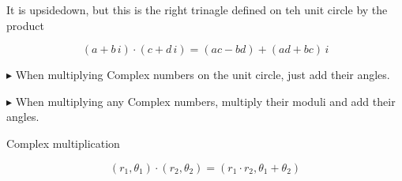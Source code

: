 \documentclass{ximera}
\begin{document}
It is upsidedown, but this is the right trinagle defined on teh unit circle by the product

\[  (a + b \, i) \cdot (c + d \, i) = (ac-bd) + (ad+bc) \, i    \]




$\blacktriangleright$ When multiplying Complex numbers on the unit circle, just add their angles.

$\blacktriangleright$ When multiplying any Complex numbers, multiply their moduli and add their angles.



\begin{theorem} Complex multiplication

\[  (r_1, \theta_1) \cdot (r_2, \theta_2) = (r_1 \cdot r_2, \theta_1 + \theta_2)              \]


\end{theorem}
\end{document}
